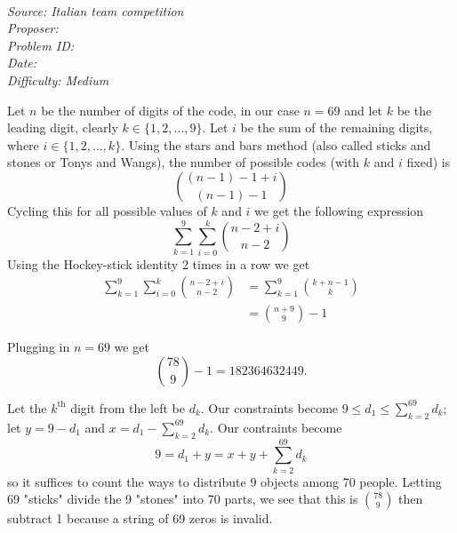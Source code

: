 \SSbreak\\
\emph{Source: Italian team competition}\\
\emph{Proposer: \Phobo}\\ %
\emph{Problem ID:}\\
\emph{Date: }\\
\emph{Difficulty: Medium}\\
\SSbreak

\bigskip

\begin{solution}\hfil\medskip

Let $n$ be the number of digits of the code, in our case $n=69$ and let $k$ be the leading digit, clearly $k\in\{1,2,\dots,9\}$. Let $i$ be the sum of the remaining digits, where $i\in\{1,2,\dots,k\}$. Using the stars and bars method (also called sticks and stones or Tonys and Wangs), the number of possible codes (with $k$ and $i$ fixed) is $$\binom{(n-1)-1+i}{(n-1)-1}$$ Cycling this for all possible values of $k$ and $i$ we get the following expression $$\sum_{k=1}^{9}\sum_{i=0}^{k}\binom{n-2+i}{n-2}$$ Using the Hockey-stick identity 2 times in a row we get 
\begin{align*}
    \sum_{k=1}^{9}\sum_{i=0}^{k}\binom{n-2+i}{n-2}&=\sum_{k=1}^{9}\binom{k+n-1}{k} \\
    &=\binom{n+9}{9}-1
\end{align*}

Plugging in $n = 69$ we get $$\binom{78}{9} - 1 = \boxed{182364632449}.$$
	
\end{solution}\bigskip

\begin{solution}\hfil\medskip

	Let the $k^\text{th}$ digit from the left be $d_k$. Our constraints become $9 \leq d_1 \leq \sum_{k = 2}^{69} d_k$; let $y = 9 - d_1$ and $x = d_1 - \sum_{k = 2}^{69}d_k$.
	Our contraints become $$9 = d_1 + y = x + y + \sum_{k = 2}^{69} d_k$$ so it suffices to count the ways to distribute 9 objects among 70 people.
	Letting 69 "sticks" divide the 9 "stones" into 70 parts, we see that this is $\binom{78}{9}$ then subtract 1 because a string of 69 zeros is invalid. 
\end{solution}